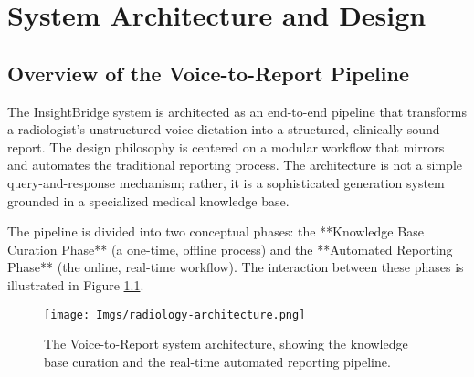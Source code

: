 \chapter{System Architecture and Design}
\label{cha:architecture}

\section{Overview of the Voice-to-Report Pipeline}

The InsightBridge system is architected as an end-to-end pipeline that transforms a radiologist's unstructured voice dictation into a structured, clinically sound report. The design philosophy is centered on a modular workflow that mirrors and automates the traditional reporting process. The architecture is not a simple query-and-response mechanism; rather, it is a sophisticated generation system grounded in a specialized medical knowledge base.

The pipeline is divided into two conceptual phases: the **Knowledge Base Curation Phase** (a one-time, offline process) and the **Automated Reporting Phase** (the online, real-time workflow). The interaction between these phases is illustrated in Figure \ref{fig:radiology_architecture}.

\begin{figure}[!htbp]
    \centering
    \texttt{[image: Imgs/radiology-architecture.png]}
    \caption{The Voice-to-Report system architecture, showing the knowledge base curation and the real-time automated reporting pipeline.}
    \label{fig:radiology_architecture}
\end{figure}

